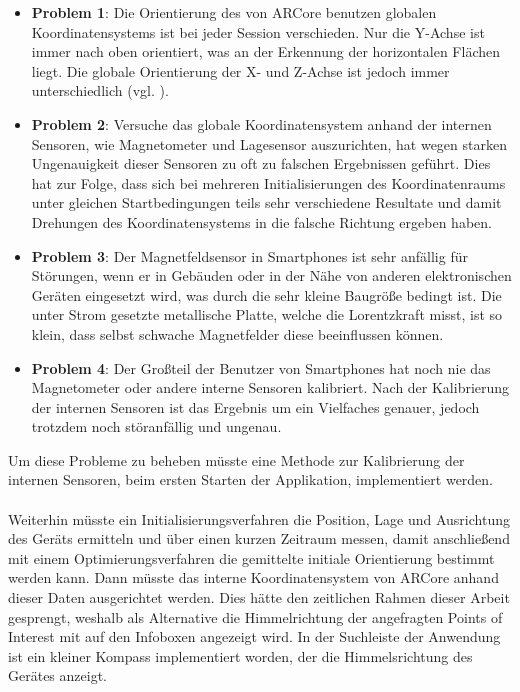 \begin{itemize}

\item \textbf{Problem 1}: Die Orientierung des von ARCore benutzen globalen Koordinatensystems ist bei jeder Session verschieden. Nur die Y-Achse ist immer nach oben orientiert, was an der Erkennung der horizontalen Flächen liegt. Die globale Orientierung der X- und Z-Achse ist jedoch immer unterschiedlich (vgl. \cite{arcore_geo}).

\item \textbf{Problem 2}: Versuche das globale Koordinatensystem anhand der internen Sensoren, wie Magnetometer und Lagesensor auszurichten, hat wegen starken Ungenauigkeit dieser Sensoren zu oft zu falschen Ergebnissen geführt. Dies hat zur Folge, dass sich bei mehreren Initialisierungen des Koordinatenraums unter gleichen Startbedingungen teils sehr verschiedene Resultate und damit Drehungen des Koordinatensystems in die falsche Richtung ergeben haben. 

\item \textbf{Problem 3}: Der Magnetfeldsensor in Smartphones ist sehr anfällig für Störungen, wenn er in Gebäuden oder in der Nähe von anderen elektronischen Geräten eingesetzt wird, was durch die sehr kleine Baugröße bedingt ist. Die unter Strom gesetzte metallische Platte, welche die Lorentzkraft misst, ist so klein, dass selbst schwache Magnetfelder diese beeinflussen können.

\item \textbf{Problem 4}: Der Großteil der Benutzer von Smartphones hat noch nie das Magnetometer oder andere interne Sensoren kalibriert. Nach der Kalibrierung der internen Sensoren ist das Ergebnis um ein Vielfaches genauer, jedoch trotzdem noch störanfällig und ungenau.
\end{itemize}

Um diese Probleme zu beheben müsste eine Methode zur Kalibrierung der internen Sensoren, beim ersten Starten der Applikation, implementiert werden. \\ \\ Weiterhin müsste ein Initialisierungsverfahren die Position, Lage und Ausrichtung des Geräts ermitteln und über einen kurzen Zeitraum messen, damit anschließend mit einem Optimierungsverfahren die gemittelte initiale Orientierung bestimmt werden kann. Dann müsste das interne Koordinatensystem von ARCore anhand dieser Daten ausgerichtet werden. Dies hätte den zeitlichen Rahmen dieser Arbeit gesprengt, weshalb als Alternative die Himmelrichtung der angefragten Points of Interest mit auf den Infoboxen angezeigt wird. In der Suchleiste der Anwendung ist ein kleiner Kompass implementiert worden, der die Himmelsrichtung des Gerätes anzeigt. 


